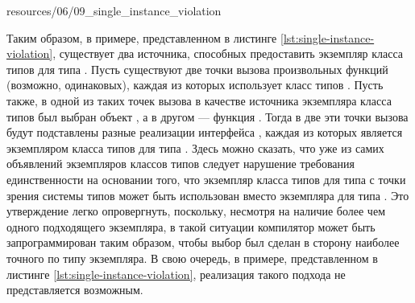
{resources/06/09_single_instance_violation}

Таким образом, в примере, представленном в листинге \ref{lst:single-instance-violation}, существует два источника, способных предоставить экземпляр класса типов  для типа . Пусть существуют две точки вызова произвольных функций (возможно, одинаковых), каждая из которых использует класс типов . Пусть также, в одной из таких точек вызова в качестве источника экземпляра класса типов был выбран объект , а в другом --- функция . Тогда в две эти точки вызова будут подставлены разные реализации интерфейса , каждая из которых является экземпляром класса типов  для типа . Здесь можно сказать, что уже из самих объявлений экземпляров классов типов следует нарушение требования единственности на основании того, что экземпляр класса типов  для типа  с точки зрения системы типов может быть использован вместо экземпляра для типа . Это утверждение легко опровергнуть, поскольку, несмотря на наличие более чем одного подходящего экземпляра, в такой ситуации компилятор может быть запрограммирован таким образом, чтобы выбор был сделан в сторону наиболее точного по типу экземпляра. В свою очередь, в примере, представленном в листинге \ref{lst:single-instance-violation}, реализация такого подхода не представляется возможным.   


